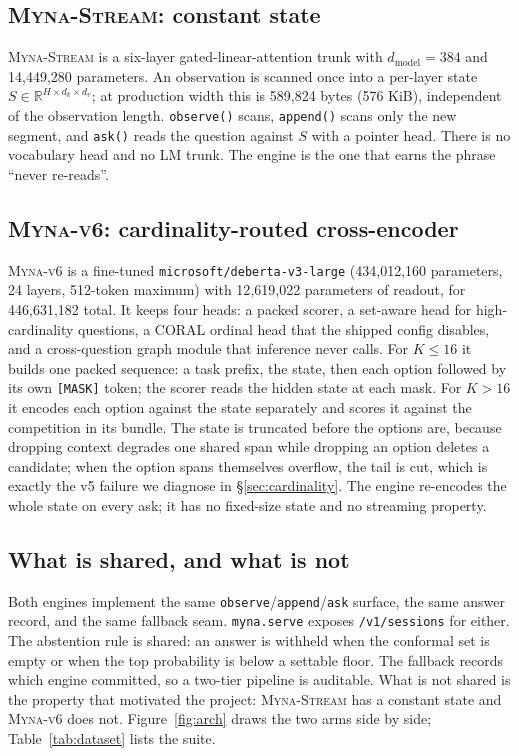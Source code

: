 \documentclass[11pt]{article}
\newcommand{\stream}{\textsc{Myna-Stream}}
\newcommand{\vsix}{\textsc{Myna-v6}}
\begin{document}
\subsection{\stream{}: constant state}
\stream{} is a six-layer gated-linear-attention trunk with $d_{\text{model}}=384$ and 14{,}449{,}280 parameters. An observation is scanned once into a per-layer state $S\in\mathbb{R}^{H\times d_k\times d_v}$; at production width this is 589{,}824 bytes (576 KiB), independent of the observation length. \texttt{observe()} scans, \texttt{append()} scans only the new segment, and \texttt{ask()} reads the question against $S$ with a pointer head. There is no vocabulary head and no LM trunk. The engine is the one that earns the phrase “never re-reads”.

\subsection{\vsix{}: cardinality-routed cross-encoder}
\vsix{} is a fine-tuned \texttt{microsoft/deberta-v3-large} (434{,}012{,}160 parameters, 24 layers, 512-token maximum) with 12{,}619{,}022 parameters of readout, for 446{,}631{,}182 total. It keeps four heads: a packed scorer, a set-aware head for high-cardinality questions, a CORAL ordinal head that the shipped config disables, and a cross-question graph module that inference never calls. For $K\le16$ it builds one packed sequence: a task prefix, the state, then each option followed by its own \texttt{[MASK]} token; the scorer reads the hidden state at each mask. For $K>16$ it encodes each option against the state separately and scores it against the competition in its bundle. The state is truncated before the options are, because dropping context degrades one shared span while dropping an option deletes a candidate; when the option spans themselves overflow, the tail is cut, which is exactly the v5 failure we diagnose in \S\ref{sec:cardinality}. The engine re-encodes the whole state on every ask; it has no fixed-size state and no streaming property.

\subsection{What is shared, and what is not}
Both engines implement the same \texttt{observe}/\texttt{append}/\texttt{ask} surface, the same answer record, and the same fallback seam. \texttt{myna.serve} exposes \texttt{/v1/sessions} for either. The abstention rule is shared: an answer is withheld when the conformal set is empty or when the top probability is below a settable floor. The fallback records which engine committed, so a two-tier pipeline is auditable. What is not shared is the property that motivated the project: \stream{} has a constant state and \vsix{} does not. Figure~\ref{fig:arch} draws the two arms side by side; Table~\ref{tab:dataset} lists the suite.
\end{document}
